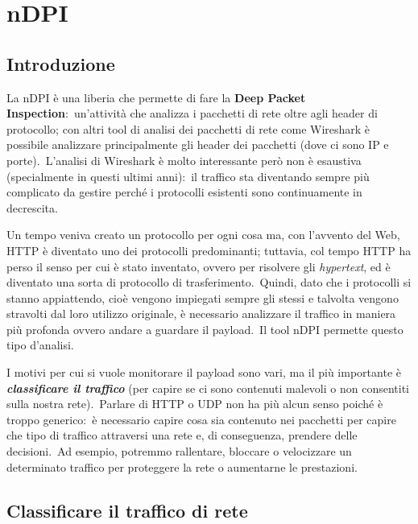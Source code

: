 \chapter{nDPI}

\section{Introduzione}

La nDPI è una liberia che permette di fare la \textbf{Deep Packet Inspection}:\ un'attività che analizza i pacchetti di rete oltre agli header di protocollo; con altri tool di analisi dei pacchetti di rete come Wireshark è possibile analizzare principalmente gli header dei pacchetti (dove ci sono IP e porte).\
L'analisi di Wireshark è molto interessante però non è esaustiva (specialmente in questi ultimi anni):\ il traffico sta diventando sempre più complicato da gestire perché i protocolli esistenti sono continuamente in decrescita.\

Un tempo veniva creato un protocollo per ogni cosa ma, con l'avvento del Web, HTTP è diventato uno dei protocolli predominanti; tuttavia, col tempo HTTP ha perso il senso per cui è stato inventato, ovvero per risolvere gli \textit{hypertext}, ed è diventato una sorta di protocollo di trasferimento.\
Quindi, dato che i protocolli si stanno appiattendo, cioè vengono impiegati sempre gli stessi e talvolta vengono stravolti dal loro utilizzo originale, è necessario analizzare il traffico in maniera più profonda ovvero andare a guardare il payload.\
Il tool nDPI permette questo tipo d'analisi.

I motivi per cui si vuole monitorare il payload sono vari, ma il più importante è \textbf{\textit{classificare il traffico}} (per capire se ci sono contenuti malevoli o non consentiti sulla nostra rete).\
Parlare di HTTP o UDP non ha più alcun senso poiché è troppo generico:\ è necessario capire cosa sia contenuto nei pacchetti per capire che tipo di traffico attraversi una rete e, di conseguenza, prendere delle decisioni.\
Ad esempio, potremmo rallentare, bloccare o velocizzare un determinato traffico per proteggere la rete o aumentarne le prestazioni.\

\section{Classificare il traffico di rete}

